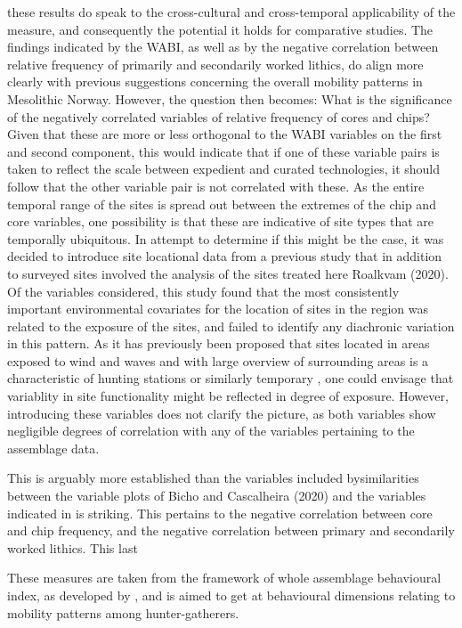 \documentclass[
]{article}
\begin{document}
these results do speak to the cross-cultural and cross-temporal applicability of the measure, and consequently the potential it holds for comparative studies. The findings indicated by the WABI, as well as by the negative correlation between relative frequency of primarily and secondarily worked lithics, do align more clearly with previous suggestions concerning the overall mobility patterns in Mesolithic Norway. However, the question then becomes: What is the significance of the negatively correlated variables of relative frequency of cores and chips? Given that these are more or less orthogonal to the WABI variables on the first and second component, this would indicate that if one of these variable pairs is taken to reflect the scale between expedient and curated technologies, it should follow that the other variable pair is not correlated with these. As the entire temporal range of the sites is spread out between the extremes of the chip and core variables, one possibility is that these are indicative of site types that are temporally ubiquitous. In attempt to determine if this might be the case, it was decided to introduce site locational data from a previous study that in addition to surveyed sites involved the analysis of the sites treated here Roalkvam (2020). Of the variables considered, this study found that the most consistently important environmental covariates for the location of sites in the region was related to the exposure of the sites, and failed to identify any diachronic variation in this pattern. As it has previously been proposed that sites located in areas exposed to wind and waves and with large overview of surrounding areas is a characteristic of hunting stations or similarly temporary , one could envisage that variablity in site functionality might be reflected in degree of exposure. However, introducing these variables does not clarify the picture, as both variables show negligible degrees of correlation with any of the variables pertaining to the assemblage data.

This is arguably more established than the variables included bysimilarities between the variable plots of Bicho and Cascalheira (2020) and the variables indicated in is striking. This pertains to the negative correlation between core and chip frequency, and the negative correlation between primary and secondarily worked lithics. This last

These measures are taken from the framework of whole assemblage behavioural index, as developed by , and is aimed to get at behavioural dimensions relating to mobility patterns among hunter-gatherers.
\end{document}
